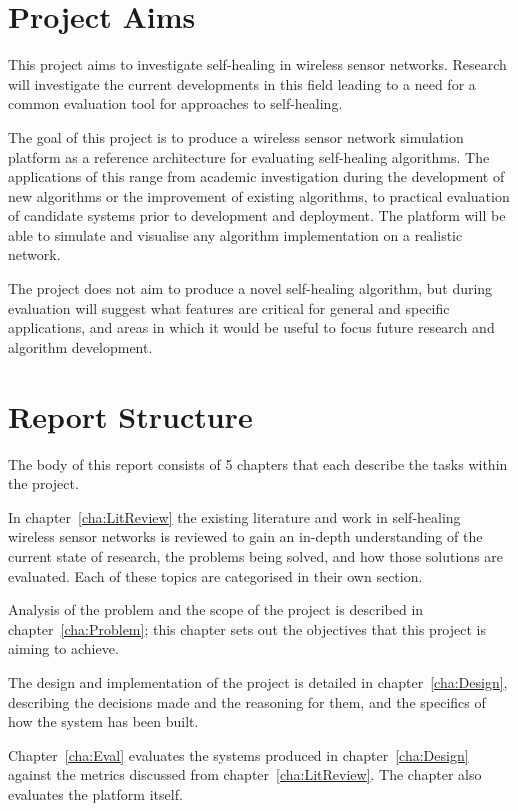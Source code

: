 \documentclass[authoryearcitations]{UoYCSproject}
\begin{document}
\section{Project Aims}

This project aims to investigate self-healing in wireless sensor networks. Research will investigate the current developments in this field leading to a need for a common evaluation tool for approaches to self-healing.

The goal of this project is to produce a wireless sensor network simulation platform as a reference architecture for evaluating self-healing algorithms. The applications of this range from academic investigation during the development of new algorithms or the improvement of existing algorithms, to practical evaluation of candidate systems prior to development and deployment. The platform will be able to simulate and visualise any algorithm implementation on a realistic network.

The project does not aim to produce a novel self-healing algorithm, but during evaluation will suggest what features are critical for general and specific applications, and areas in which it would be useful to focus future research and algorithm development.

\section{Report Structure}

The body of this report consists of 5 chapters that each describe the tasks within the project.

In chapter~\ref{cha:LitReview} the existing literature and work in self-healing wireless sensor networks is reviewed to gain an in-depth understanding of the current state of research, the problems being solved, and how those solutions are evaluated. Each of these topics are categorised in their own section.

Analysis of the problem and the scope of the project is described in chapter~\ref{cha:Problem}; this chapter sets out the objectives that this project is aiming to achieve.

The design and implementation of the project is detailed in chapter~\ref{cha:Design}, describing the decisions made and the reasoning for them, and the specifics of how the system has been built.

Chapter~\ref{cha:Eval} evaluates the systems produced in chapter~\ref{cha:Design} against the metrics discussed from chapter~\ref{cha:LitReview}. The chapter also evaluates the platform itself.
\end{document}
